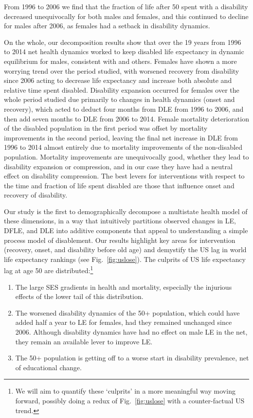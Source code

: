From 1996 to 2006 we find that the fraction of life after 50 spent with a disability decreased unequivocally for both males and females, and this continued to decline for males after 2006, as females had a setback in disability dynamics. 

On the whole, our decomposition results show that over the 19 years from 1996 to 2014 net health dynamics worked to keep disabled life expectancy in dynamic equilibrium for males, consistent with \citet{manton1982changing} and others. Females have shown a more worrying trend over the period studied, with worsened recovery from disability since 2006 acting to decrease life expectancy and increase both absolute and relative time spent disabled. Disability expansion occurred for females over the whole period studied due primarily to changes in health dynamics (onset and recovery), which acted to deduct four months from DLE from 1996 to 2006, and then add seven months to DLE from 2006 to 2014. Female mortality deterioration of the disabled population in the first period was offset by mortality improvements in the second period, leaving the final net increase in DLE from 1996 to 2014 almost entirely due to mortality improvements of the non-disabled population. Mortality improvements are unequivocally good, whether they lead to disability expansion or compression, and in our case they have had a neutral effect on disability compression. The best levers for interventions with respect to the time and fraction of life spent disabled are those that influence onset and recovery of disability.

Our study is the first to demographically decompose a multistate health model of these dimensions, in a way that intuitively partitions observed changes in LE, DFLE, and DLE into additive components that appeal to understanding a simple process model of disablement. Our results highlight key areas for intervention (recovery, onset, and disability before old age) and demystify the US lag in world life expectancy rankings (see Fig.~\ref{fig:uslose}). The culprits of US life expectancy lag at age 50 are distributed:\footnote{ We will aim to quantify these `culprits' in a more meaningful way moving forward, possibly doing a redux of Fig.~\ref{fig:uslose} with a counter-factual US trend.}

\begin{enumerate}
\item The large SES gradients in health and mortality, especially the injurious effects of the lower tail of this distribution.
\item The worsened disability dynamics of the 50+ population, which could have added half a year to LE for females, had they remained unchanged since 2006. Although disability dynamics have had no effect on male LE in the net, they remain an available lever to improve LE.
\item The 50+ population is getting off to a worse start in disability prevalence, net of educational change.
\end{enumerate}

